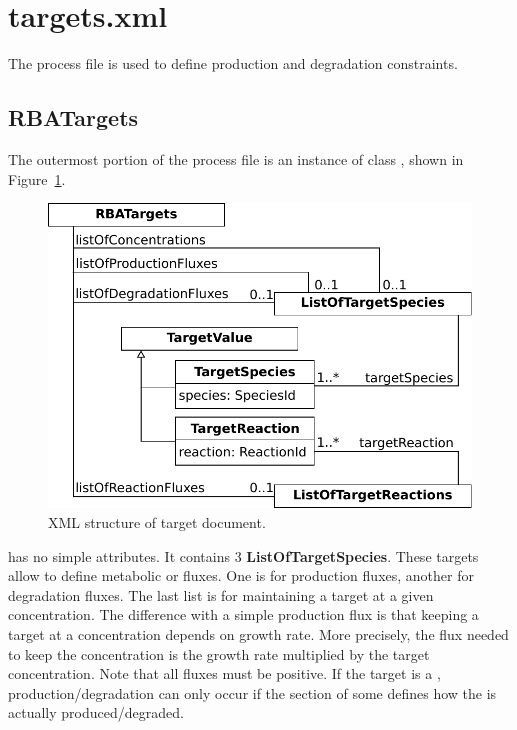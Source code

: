 
\section{targets.xml}

The process file is used to define production and degradation constraints.

\subsection{RBATargets}
\label{sec:rba_targets}

The outermost portion of the process file is an instance of class
\rbatargets, shown in Figure~\ref{fig:targets_doc}.

\begin{figure}
  \centering
  \includegraphics[scale=0.8]{figures/targets_doc}
  \caption{XML structure of target document.}
\label{fig:targets_doc}
\end{figure}

\rbatargets{} has no simple attributes.
It contains 3 \textbf{ListOfTargetSpecies}.
These targets allow to define metabolic \species{} or \macromolecule{} fluxes.
One is for production fluxes, another for degradation fluxes.
The last list is for maintaining a target at a given concentration.
The difference with a simple production flux is that keeping a target at a
concentration depends on growth rate.
More precisely, the flux needed to keep the concentration is
the growth rate multiplied by the target concentration.
Note that all fluxes must be positive.
If the target is a \macromolecule, production/degradation can only occur
if the \processings{} section of some \process{} defines how the
\macromolecule{} is actually produced/degraded.

